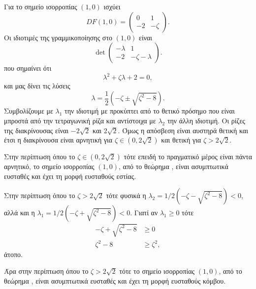 \begin{solution}
    Για το σημείο ισορροπίας \( (1, 0) \) ισχύει
    \begin{equation*}
        DF(1, 0) =
        \begin{pmatrix}
            0 & 1 \\
            -2 & -\zeta
        \end{pmatrix}.
    \end{equation*}
    Οι ιδιοτιμές της γραμμικοποίησης στο \( (1, 0) \) είναι
    \begin{equation*}
        \det
        \begin{pmatrix}
            -\lambda & 1 \\
            -2 & -\zeta - \lambda
        \end{pmatrix}.
    \end{equation*}
    που σημαίνει ότι
    \begin{equation*}
        \lambda^2 + \zeta \lambda + 2 = 0,
    \end{equation*}
    και μας δίνει τις λύσεις
    \begin{equation*}
        \lambda = \frac{1}{2}\left( -\zeta \pm \sqrt{\zeta^2 - 8} \right).
    \end{equation*}
    Συμβολίζουμε με \( \lambda_1 \) την ιδιοτιμή με προκύπτει από το θετικό
    πρόσημο που είναι μπροστά από την τετραγωνική ρίζα και αντίστοιχα με
    \( \lambda_2 \) την άλλη ιδιοτιμή. Οι ρίζες της διακρίνουσας είναι \(
    -2\sqrt{2} \) και \( 2\sqrt{2} \). Όμως η απόσβεση είναι αυστηρά θετική και
    έτσι η διακρίνουσα είναι αρνητική για \( \zeta \in (0, 2\sqrt{2}) \) και
    θετική για \( \zeta > 2\sqrt{2} \).

    Στην περίπτωση όπου το \( \zeta \in (0, 2\sqrt{2}) \) τότε επειδή
    το πραγματικό μέρος είναι πάντα αρνητικό, το σημείο ισορροπίας \( (1,
    0) \), από το θεώρημα , είναι ασυμπτωτικά ευσταθές
    και έχει τη μορφή ευσταθούς εστίας.

    Στην περίπτωση όπου το \( \zeta > 2\sqrt{2} \) τότε φυσικά η \( \lambda_2 =
    1/2 \left( -\zeta - \sqrt{\zeta^2 - 8} \right) < 0 \), αλλά και η \( \lambda_1 =
    1/2 \left( -\zeta +\sqrt{\zeta^2 - 8} \right) < 0 \). Γιατί αν \( \lambda_1
    \geq 0 \) τότε
    \begin{align*}
        -\zeta + \sqrt{\zeta^2 - 8} &\geq 0 \\
        \zeta^2 - 8 &\geq \zeta^2,
    \end{align*}
    άτοπο.

    Άρα στην περίπτωση όπου το \( \zeta > 2\sqrt{2} \) τότε το σημείο
    ισορροπίας \( (1, 0) \), από το θεώρημα , είναι
    ασυμπτωτικά ευσταθές και έχει τη μορφή ευσταθούς κόμβου.


\end{solution}
